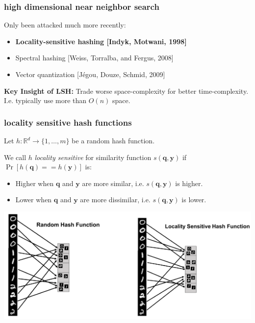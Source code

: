 \documentclass[compress]{beamer}
\newcommand{\bv}[1]{\mathbf{#1}}
\newcommand{\R}{\mathbb{R}}
\begin{document}
\begin{frame}
	\frametitle{high dimensional near neighbor search}	
	Only been attacked much more recently:
	\begin{itemize}
		\item \textbf{\alert{Locality-sensitive hashing [Indyk, Motwani, 1998]}}
		\item Spectral hashing [Weiss, Torralba, and Fergus, 2008]
		\item Vector quantization [J\'{e}gou, Douze, Schmid, 2009]
	\end{itemize}

\textbf{Key Insight of LSH:} Trade worse space-complexity for better time-complexity. I.e. typically use more than $O(n)$ space.
\end{frame}

\begin{frame}
	\frametitle{locality sensitive hash functions}
	Let $h: \R^d \rightarrow \{1, \ldots, m\}$ be a random hash function. 
	
	We call $h$ \emph{locality sensitive} for similarity function $s(\bv{q},\bv{y})$ if $\Pr\left[h(\bv{q}) == h(\bv{y})\right]$ is:
	\begin{itemize}
		\item Higher when $\bv{q}$ and $\bv{y}$ are more similar, i.e. $s(\bv{q},\bv{y})$ is higher.
		\item Lower when $\bv{q}$ and $\bv{y}$ are more dissimilar, i.e. $s(\bv{q},\bv{y})$ is lower. 
	\end{itemize}
\begin{center}
	\includegraphics[width=.9\textwidth]{cam_lsh.png}
\end{center}
\end{frame}
\end{document}
